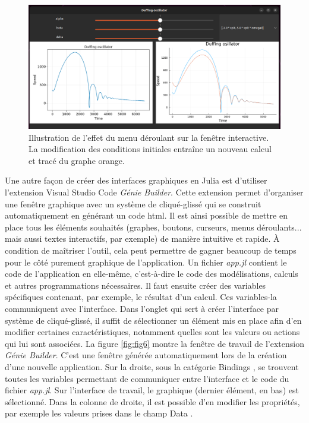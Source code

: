 \documentclass[a4paper, french, 12pt, titlepage]{article}
\begin{document}
\begin{figure}[H]
  \includegraphics[width=\linewidth]{interactivewindow_4.png}
  \caption{Illustration de l'effet du menu déroulant sur la fenêtre interactive. La modification des conditions initiales entraîne un nouveau calcul et tracé du graphe orange.}
  \label{fig:fig5}
\end{figure}

Une autre façon de créer des interfaces graphiques en Julia est d'utiliser l'extension Visual Studio Code \emph{Génie Builder}.
Cette extension permet d'organiser une fenêtre graphique avec un système de \og cliqué-glissé \fg qui se construit automatiquement en générant un code html.
Il est ainsi possible de mettre en place tous les éléments souhaités (graphes, boutons, curseurs, menus déroulants... mais aussi textes interactifs, par exemple) de manière intuitive et rapide.
À condition de maîtriser l'outil, cela peut permettre de gagner beaucoup de temps pour le côté purement graphique de l'application.
Un fichier \emph{app.jl} contient le code de l'application en elle-même, c'est-à-dire le code des modélisations, calculs et autres programmations nécessaires.
Il faut ensuite créer des variables spécifiques contenant, par exemple, le résultat d'un calcul.
Ces variables-la communiquent avec l'interface.
Dans l'onglet qui sert à créer l'interface par système de cliqué-glissé, il suffit de sélectionner un élément mis en place afin d'en modifier certaines caractéristiques, notamment quelles sont les valeurs ou actions qui lui sont associées. 
La figure \ref{fig:fig6} montre la fenêtre de travail de l'extension \emph{Génie Builder}.
C'est une fenêtre générée automatiquement lors de la création d'une nouvelle application.
Sur la droite, sous la catégorie \og Bindings \fg, se trouvent toutes les variables permettant de communiquer entre l'interface et le code du fichier \emph{app.jl}.
Sur l'interface de travail, le graphique (dernier élément, en bas) est sélectionné.
Dans la colonne de droite, il est possible d'en modifier les propriétés, par exemple les valeurs prises dans le champ \og Data \fg. 
\end{document}
